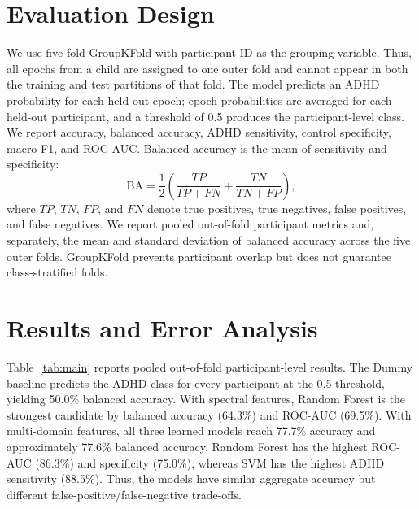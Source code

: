 \documentclass{article}
\begin{document}
\section{Evaluation Design}
We use five-fold GroupKFold with participant ID as the grouping variable. Thus, all epochs from a child are assigned to one outer fold and cannot appear in both the training and test partitions of that fold. The model predicts an ADHD probability for each held-out epoch; epoch probabilities are averaged for each held-out participant, and a threshold of 0.5 produces the participant-level class. We report accuracy, balanced accuracy, ADHD sensitivity, control specificity, macro-F1, and ROC-AUC. Balanced accuracy is the mean of sensitivity and specificity:
\[
\mathrm{BA}=\frac{1}{2}\left(\frac{TP}{TP+FN}+\frac{TN}{TN+FP}\right),
\]
where $TP$, $TN$, $FP$, and $FN$ denote true positives, true negatives, false positives, and false negatives. We report pooled out-of-fold participant metrics and, separately, the mean and standard deviation of balanced accuracy across the five outer folds. GroupKFold prevents participant overlap but does not guarantee class-stratified folds.

\section{Results and Error Analysis}
Table~\ref{tab:main} reports pooled out-of-fold participant-level results. The Dummy baseline predicts the ADHD class for every participant at the 0.5 threshold, yielding 50.0\% balanced accuracy. With spectral features, Random Forest is the strongest candidate by balanced accuracy (64.3\%) and ROC-AUC (69.5\%). With multi-domain features, all three learned models reach 77.7\% accuracy and approximately 77.6\% balanced accuracy. Random Forest has the highest ROC-AUC (86.3\%) and specificity (75.0\%), whereas SVM has the highest ADHD sensitivity (88.5\%). Thus, the models have similar aggregate accuracy but different false-positive/false-negative trade-offs.
\end{document}

